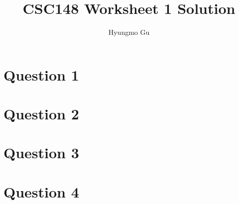 \documentclass[12pt]{article}
\begin{document}
\title{CSC148 Worksheet 1 Solution}
\author{Hyungmo Gu}
\maketitle

\section*{Question 1}

\section*{Question 2}

\section*{Question 3}

\section*{Question 4}
\end{document}
